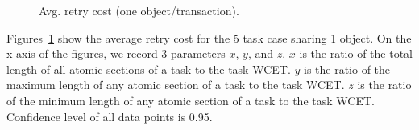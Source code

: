 \documentclass[prodmode,acmtecs]{acmsmall}
\begin{document}
\begin{compactenum}
\begin{figure}
\centering
{}
\caption{Avg. retry cost (one object/transaction).}
\label{fig:pnf_results_uniobject}
\end{figure}

Figures~\ref{fig:pnf_results_uniobject} show the average retry cost for the 5 task case sharing 1 object. On the x-axis of the figures, we record 3 parameters $x$, $y$, and $z$. $x$ is the ratio of the total length of all atomic sections of a task to the task WCET. $y$ is the ratio of the maximum length of any atomic section of a task to the task WCET. $z$ is the ratio of the minimum length of any atomic section of a task to the task WCET. Confidence level of all data points is 0.95.
 

\end{compactenum}
\end{document}

